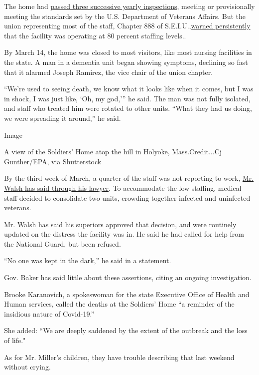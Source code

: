 The home had
\href{https://www.propublica.org/article/superintendent-bragged-about-va-review-of-short-staffed-soldiers-home-two-months-later-73-veterans-are-dead}{passed
three successive yearly inspections}, meeting or provisionally meeting
the standards set by the U.S. Department of Veterans Affairs. But the
union representing most of the staff, Chapter 888 of
S.E.I.U.,\href{https://www.cnn.com/2020/04/06/us/holyoke-soldiers-home-coronavirus/index.html}{warned
persistently} that the facility was operating at 80 percent staffing
levels..

By March 14, the home was closed to most visitors, like most nursing
facilities in the state. A man in a dementia unit began showing
symptoms, declining so fast that it alarmed Joseph Ramirez, the vice
chair of the union chapter.

``We're used to seeing death, we know what it looks like when it comes,
but I was in shock, I was just like, `Oh, my god,''' he said. The man
was not fully isolated, and staff who treated him were rotated to other
units. ``What they had us doing, we were spreading it around,'' he said.

Image

A view of the Soldiers' Home atop the hill in Holyoke, Mass.Credit...Cj
Gunther/EPA, via Shutterstock

By the third week of March, a quarter of the staff was not reporting to
work,
\href{https://www.gazettenet.com/Soldiers-Home-superintendent-responds-33796782}{Mr.
Walsh has said through his lawyer}. To accommodate the low staffing,
medical staff decided to consolidate two units, crowding together
infected and uninfected veterans.

Mr. Walsh has said his superiors approved that decision, and were
routinely updated on the distress the facility was in. He said he had
called for help from the National Guard, but been refused.

``No one was kept in the dark,'' he said in a statement.

Gov. Baker has said little about these assertions, citing an ongoing
investigation.

Brooke Karanovich, a spokeswoman for the state Executive Office of
Health and Human services, called the deaths at the Soldiers' Home ``a
reminder of the insidious nature of Covid-19.''

She added: ``We are deeply saddened by the extent of the outbreak and
the loss of life."

As for Mr. Miller's children, they have trouble describing that last
weekend without crying.

